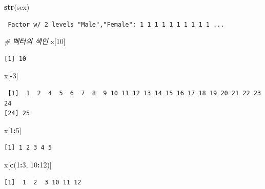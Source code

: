 \documentclass[11pt,a4paper]{book}
\newenvironment{Shaded}{\begin{snugshade}}{\end{snugshade}}
\newcommand{\KeywordTok}[1]{\textcolor[rgb]{0.13,0.29,0.53}{\textbf{#1}}}
\newcommand{\DecValTok}[1]{\textcolor[rgb]{0.00,0.00,0.81}{#1}}
\newcommand{\CommentTok}[1]{\textcolor[rgb]{0.56,0.35,0.01}{\textit{#1}}}
\newcommand{\OperatorTok}[1]{\textcolor[rgb]{0.81,0.36,0.00}{\textbf{#1}}}
\newcommand{\NormalTok}[1]{#1}
\theoremstyle{definition}
\theoremstyle{definition}
\theoremstyle{definition}
\theoremstyle{remark}
\begin{document}
\begin{Shaded}
\begin{Highlighting}[]
\KeywordTok{str}\NormalTok{(sex)}
\end{Highlighting}
\end{Shaded}

\begin{verbatim}
 Factor w/ 2 levels "Male","Female": 1 1 1 1 1 1 1 1 1 1 ...
\end{verbatim}

\begin{Shaded}
\begin{Highlighting}[]
\CommentTok{# 벡터의 색인}
\NormalTok{x[}\DecValTok{10}\NormalTok{]}
\end{Highlighting}
\end{Shaded}

\begin{verbatim}
[1] 10
\end{verbatim}

\begin{Shaded}
\begin{Highlighting}[]
\NormalTok{x[}\OperatorTok{-}\DecValTok{3}\NormalTok{]}
\end{Highlighting}
\end{Shaded}

\begin{verbatim}
 [1]  1  2  4  5  6  7  8  9 10 11 12 13 14 15 16 17 18 19 20 21 22 23 24
[24] 25
\end{verbatim}

\begin{Shaded}
\begin{Highlighting}[]
\NormalTok{x[}\DecValTok{1}\OperatorTok{:}\DecValTok{5}\NormalTok{]}
\end{Highlighting}
\end{Shaded}

\begin{verbatim}
[1] 1 2 3 4 5
\end{verbatim}

\begin{Shaded}
\begin{Highlighting}[]
\NormalTok{x[}\KeywordTok{c}\NormalTok{(}\DecValTok{1}\OperatorTok{:}\DecValTok{3}\NormalTok{, }\DecValTok{10}\OperatorTok{:}\DecValTok{12}\NormalTok{)]}
\end{Highlighting}
\end{Shaded}

\begin{verbatim}
[1]  1  2  3 10 11 12
\end{verbatim}
\end{document}
